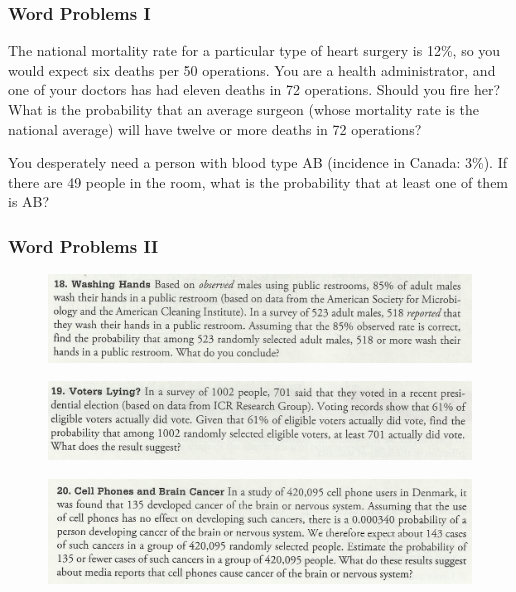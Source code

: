 \documentclass[xcolor=dvipsnames]{beamer}
\begin{document}
\begin{frame}
  \frametitle{Word Problems I}
The national mortality rate for a particular type of heart surgery
is 12\%, so you would expect six deaths per 50 operations. You are a
health administrator, and one of your doctors has had eleven deaths in
72 operations. Should you fire her? What is the probability that an
average surgeon (whose mortality rate is the national average) will
have twelve or more deaths in 72 operations?

\bigskip

You desperately need a person with blood type AB (incidence in
Canada: 3\%). If there are 49 people in the room, what is the
probability that at least one of them is AB?
\end{frame}

\begin{frame}
  \frametitle{Word Problems II}
  \begin{figure}[h]
    \includegraphics[scale=.7]{./diagrams/triola1.png}
  \end{figure}
  \begin{figure}[h]
    \includegraphics[scale=.7]{./diagrams/triola2.png}
  \end{figure}
  \begin{figure}[h]
    \includegraphics[scale=.7]{./diagrams/triola3.png}
  \end{figure}
\end{frame}
\end{document}
